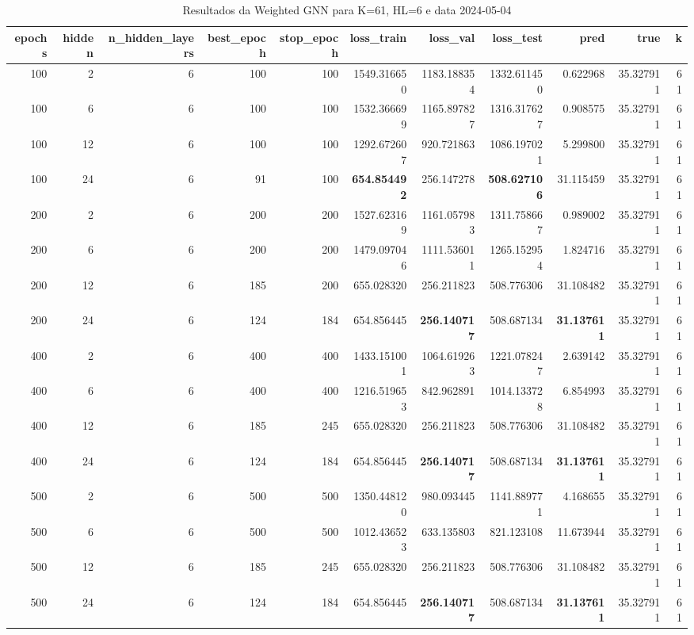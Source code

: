 \begin{table}
\caption{Resultados da Weighted GNN para K=61, HL=6 e data 2024-05-04}
\label{tab:weighted_gnn_results_k61_hl6_d20240504}
\begin{tabular}{rrrrrrrrrrr}
\toprule
epochs & hidden & n\_hidden\_layers & best\_epoch & stop\_epoch & loss\_train & loss\_val & loss\_test & pred & true & k \\
\midrule
100 & 2 & 6 & 100 & 100 & 1549.316650 & 1183.188354 & 1332.611450 & 0.622968 & 35.327911 & 61 \\
100 & 6 & 6 & 100 & 100 & 1532.366699 & 1165.897827 & 1316.317627 & 0.908575 & 35.327911 & 61 \\
100 & 12 & 6 & 100 & 100 & 1292.672607 & 920.721863 & 1086.197021 & 5.299800 & 35.327911 & 61 \\
100 & 24 & 6 & 91 & 100 & \textbf{654.854492} & 256.147278 & \textbf{508.627106} & 31.115459 & 35.327911 & 61 \\
200 & 2 & 6 & 200 & 200 & 1527.623169 & 1161.057983 & 1311.758667 & 0.989002 & 35.327911 & 61 \\
200 & 6 & 6 & 200 & 200 & 1479.097046 & 1111.536011 & 1265.152954 & 1.824716 & 35.327911 & 61 \\
200 & 12 & 6 & 185 & 200 & 655.028320 & 256.211823 & 508.776306 & 31.108482 & 35.327911 & 61 \\
200 & 24 & 6 & 124 & 184 & 654.856445 & \textbf{256.140717} & 508.687134 & \textbf{31.137611} & 35.327911 & 61 \\
400 & 2 & 6 & 400 & 400 & 1433.151001 & 1064.619263 & 1221.078247 & 2.639142 & 35.327911 & 61 \\
400 & 6 & 6 & 400 & 400 & 1216.519653 & 842.962891 & 1014.133728 & 6.854993 & 35.327911 & 61 \\
400 & 12 & 6 & 185 & 245 & 655.028320 & 256.211823 & 508.776306 & 31.108482 & 35.327911 & 61 \\
400 & 24 & 6 & 124 & 184 & 654.856445 & \textbf{256.140717} & 508.687134 & \textbf{31.137611} & 35.327911 & 61 \\
500 & 2 & 6 & 500 & 500 & 1350.448120 & 980.093445 & 1141.889771 & 4.168655 & 35.327911 & 61 \\
500 & 6 & 6 & 500 & 500 & 1012.436523 & 633.135803 & 821.123108 & 11.673944 & 35.327911 & 61 \\
500 & 12 & 6 & 185 & 245 & 655.028320 & 256.211823 & 508.776306 & 31.108482 & 35.327911 & 61 \\
500 & 24 & 6 & 124 & 184 & 654.856445 & \textbf{256.140717} & 508.687134 & \textbf{31.137611} & 35.327911 & 61 \\

\end{tabular}
\end{table}
